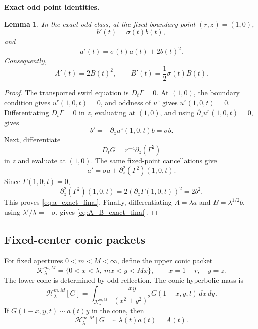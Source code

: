 \documentclass[11pt]{amsart}
\newtheorem{lemma}[theorem]{Lemma}
\begin{document}
\medskip
\noindent\textbf{Exact odd point identities.}
\begin{lemma}\label{lem:exact_odd_point_identities}
In the exact odd class, at the fixed boundary point \((r,z)=(1,0)\),
\begin{equation}\label{eq:b_exact_final}
b'(t)=\sigma(t)b(t),
\end{equation}
and
\begin{equation}\label{eq:a_exact_final}
a'(t)=\sigma(t)a(t)+2b(t)^2.
\end{equation}
Consequently,
\begin{equation}\label{eq:A_B_exact_final}
A'(t)=2B(t)^2,
\qquad
B'(t)=\frac12\sigma(t)B(t).
\end{equation}
\end{lemma}

\begin{proof}
The transported swirl equation is \(D_t\Gamma=0\).  At \((1,0)\), the boundary condition gives \(u^r(1,0,t)=0\), and oddness of \(u^z\) gives \(u^z(1,0,t)=0\).  Differentiating \(D_t\Gamma=0\) in \(z\), evaluating at \((1,0)\), and using \(\partial_z u^r(1,0,t)=0\), gives
\[
b'=-\partial_z u^z(1,0,t)b=\sigma b.
\]
Next, differentiate
\[
D_tG=r^{-4}\partial_z(\Gamma^2)
\]
in \(z\) and evaluate at \((1,0)\).  The same fixed-point cancellations give
\[
a'=\sigma a+\partial_z^2(\Gamma^2)(1,0,t).
\]
Since \(\Gamma(1,0,t)=0\),
\[
\partial_z^2(\Gamma^2)(1,0,t)=2(\partial_z\Gamma(1,0,t))^2=2b^2.
\]
This proves \eqref{eq:a_exact_final}.  Finally, differentiating \(A=\lambda a\) and \(B=\lambda^{1/2}b\), using \(\lambda'/\lambda=-\sigma\), gives \eqref{eq:A_B_exact_final}.
\end{proof}

\subsection{Fixed-center conic packets}

For fixed apertures \(0<m<M<\infty\), define the upper conic packet
\begin{equation}\label{eq:K_conic_final}
\mathcal K_\lambda^{m,M}
=
\{0<x<\lambda,\ mx<y<Mx\},
\qquad
x=1-r,
\quad y=z.
\end{equation}
The lower cone is determined by odd reflection.  The conic hyperbolic mass is
\begin{equation}\label{eq:H_conic_final}
\mathcal H_\lambda^{m,M}[G]
=
\int_{\mathcal K_\lambda^{m,M}}
\frac{xy}{(x^2+y^2)^2}G(1-x,y,t)\,dx\,dy.
\end{equation}
If \(G(1-x,y,t)\sim a(t)y\) in the cone, then
\[
\mathcal H_\lambda^{m,M}[G]\sim \lambda(t)a(t)=A(t).
\]
\end{document}
